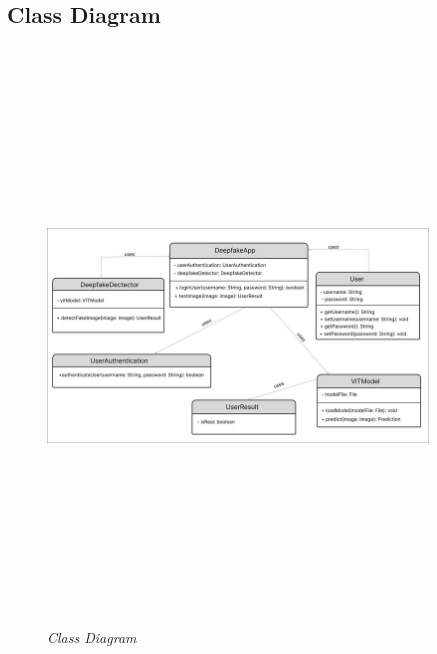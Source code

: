 
\subsection{Class Diagram}
\vspace{1cm}
\begin{figure}[h]
    \includegraphics[width=0.9\textwidth,height=6in,keepaspectratio]{img/classdiagramfig.jpg}
    \caption{\textit{Class Diagram}}
\end{figure}

\justify

